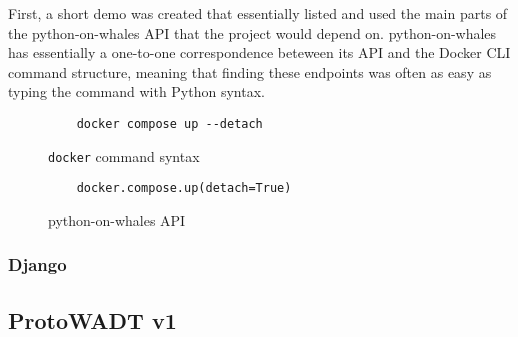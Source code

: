 \documentclass[../design-document.tex]{subfiles}
\begin{document}
First, a short demo was created that essentially listed and used the main parts of the python-on-whales API that the project would depend on. python-on-whales has essentially a one-to-one correspondence beteween its API and the Docker CLI command structure, meaning that finding these endpoints was often as easy as typing the command with Python syntax.

\begin{figure}[H]
	\centering
	\begin{verbatim}
	docker compose up --detach
	\end{verbatim}
	\caption{\texttt{docker} command syntax}
	\label{fig:docker-compose-up-cli}
\end{figure}

\begin{figure}[H]
	\centering
	\begin{verbatim}
	docker.compose.up(detach=True)
	\end{verbatim}
	\caption{python-on-whales API}
	\label{fig:docker-compose-up-python}
\end{figure}


\subsubsection{Django}

\subsection{ProtoWADT v1}
\end{document}
